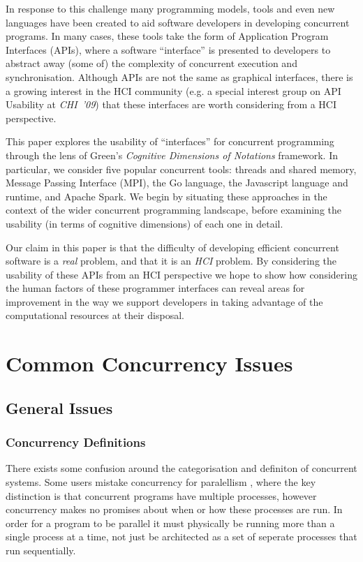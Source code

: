 \documentclass{sig-alternate}
\begin{document}
In response to this challenge many programming models, tools and even new languages have been created to aid software developers in developing concurrent programs. In many cases, these tools take the form of Application Program Interfaces (APIs), where a software ``interface'' is presented to developers to abstract away (some of) the complexity of concurrent execution and synchronisation. Although APIs are not the same as graphical interfaces, there is a growing interest in the HCI community (e.g. a special interest group on API Usability at \emph{CHI~'09}\cite{daughtry_api_2009}) that these interfaces are worth considering from a HCI perspective.

This paper explores the usability of ``interfaces'' for concurrent programming through the lens of Green's \emph{Cognitive Dimensions of  Notations} framework\cite{green89:_cognit_dimen_notat}. In particular, we consider five popular concurrent tools: threads and shared memory, Message Passing Interface (MPI), the Go language, the Javascript language and runtime, and Apache Spark.  We begin by situating these approaches in the context of the wider concurrent programming landscape, before examining the usability (in terms of cognitive dimensions) of each one in detail.

Our claim in this paper is that the difficulty of developing efficient concurrent software is a \emph{real} problem, and that it is an \emph{HCI} problem. By considering the usability of these APIs from an HCI perspective we hope to show how considering the human factors of these programmer interfaces can reveal areas for improvement in the way we support developers in taking advantage of the computational resources at their disposal.

\section{Common Concurrency Issues}
\subsection{General Issues}
\subsubsection{Concurrency Definitions}
There exists some confusion around the categorisation and definiton of concurrent systems. Some users mistake concurrency for paralellism \cite{pike13:_concur_paral}, where the key distinction is that concurrent programs have multiple processes, however concurrency makes no promises about when or how these processes are run. In order for a program to be parallel it must physically be running more than a single process at a time, not just be architected as a set of seperate processes that run sequentially.
\end{document}
